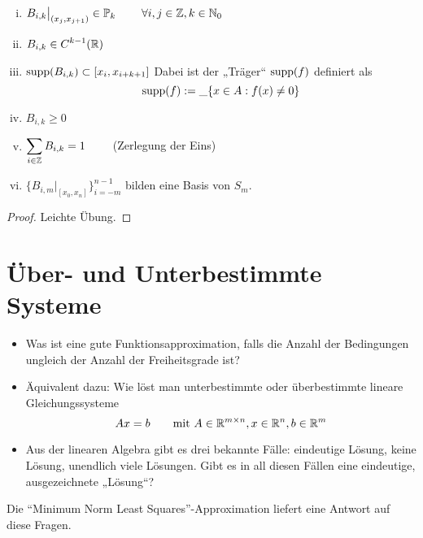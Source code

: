 \documentclass[
]{mycourse}
\begin{document}
\begin{st}[Eigenschaften]
	\label{1.36}
	\begin{enumerate}[i)]
		\item
			$\displaystyle B_{i,k}\big|_{(x_j,x_{j+1})} \in \P_k \qquad \forall i,j\in \Z, k\in \N_0$
		\item
			$\displaystyle B_{i,k} \in C^{k-1}(\mathbb{R})$
		\item
			$\displaystyle \operatorname{supp} (B_{i,k}) \subset [x_i,x_{i+k+1}]$
			Dabei ist der „Träger“ $\operatorname{supp} (f)$ definiert als
			\[
				\operatorname{supp}(f) := \_{\{x\in A : f(x) \neq 0\}}
			\]
		\item
			$\displaystyle B_{i,k} \ge 0$
		\item
			$\displaystyle \sum_{i\in \mathbb{Z}} B_{i,k} = 1 \qquad$ (Zerlegung der Eins)
		\item
			$\displaystyle \{B_{i,m}\big|_{[x_0,x_n]}\}_{i=-m}^{n-1}$ bilden eine Basis von $S_m$.
	\end{enumerate}
	\begin{proof}
		Leichte Übung.
	\end{proof}
\end{st}


\section{Über- und Unterbestimmte Systeme}


\begin{itemize}
	\item
		Was ist eine gute Funktionsapproximation, falls die Anzahl der Bedingungen ungleich der Anzahl der Freiheitsgrade ist?
	\item
		Äquivalent dazu: Wie löst man unterbestimmte oder überbestimmte lineare Gleichungssysteme
		\[
			Ax=b \qquad \text{mit } A\in \mathbb{R}^{m\times n}, x\in \mathbb{R}^n, b\in \mathbb{R}^m
		\]
	\item
		Aus der linearen Algebra gibt es drei bekannte Fälle: eindeutige Lösung, keine Lösung, unendlich viele Lösungen.
		Gibt es in all diesen Fällen eine eindeutige, ausgezeichnete „Lösung“?
\end{itemize}

Die “Minimum Norm Least Squares”-Approximation liefert eine Antwort auf diese Fragen.
\end{document}
